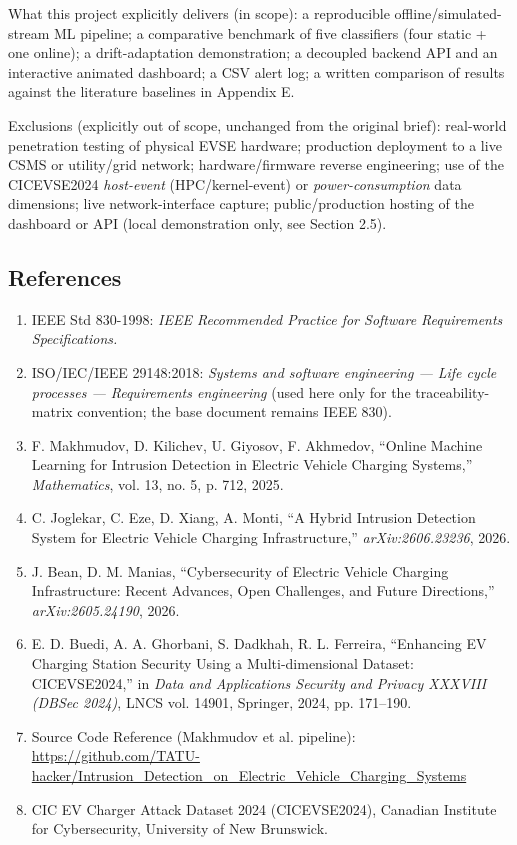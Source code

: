 \documentclass[11pt, a4paper]{article}
\begin{document}
What this project explicitly delivers (in scope): a reproducible offline/simulated-stream ML pipeline; a comparative benchmark of five classifiers (four static + one online); a drift-adaptation demonstration; a decoupled backend API and an interactive animated dashboard; a CSV alert log; a written comparison of results against the literature baselines in Appendix E.

Exclusions (explicitly out of scope, unchanged from the original brief): real-world penetration testing of physical EVSE hardware; production deployment to a live CSMS or utility/grid network; hardware/firmware reverse engineering; use of the CICEVSE2024 \textit{host-event} (HPC/kernel-event) or \textit{power-consumption} data dimensions; live network-interface capture; public/production hosting of the dashboard or API (local demonstration only, see Section 2.5).

\subsection{References}
\begin{enumerate}
    \item IEEE Std 830-1998: \textit{IEEE Recommended Practice for Software Requirements Specifications.}
    \item ISO/IEC/IEEE 29148:2018: \textit{Systems and software engineering --- Life cycle processes --- Requirements engineering} (used here only for the traceability-matrix convention; the base document remains IEEE 830).
    \item F. Makhmudov, D. Kilichev, U. Giyosov, F. Akhmedov, ``Online Machine Learning for Intrusion Detection in Electric Vehicle Charging Systems,'' \textit{Mathematics}, vol. 13, no. 5, p. 712, 2025.
    \item C. Joglekar, C. Eze, D. Xiang, A. Monti, ``A Hybrid Intrusion Detection System for Electric Vehicle Charging Infrastructure,'' \textit{arXiv:2606.23236}, 2026.
    \item J. Bean, D. M. Manias, ``Cybersecurity of Electric Vehicle Charging Infrastructure: Recent Advances, Open Challenges, and Future Directions,'' \textit{arXiv:2605.24190}, 2026.
    \item E. D. Buedi, A. A. Ghorbani, S. Dadkhah, R. L. Ferreira, ``Enhancing EV Charging Station Security Using a Multi-dimensional Dataset: CICEVSE2024,'' in \textit{Data and Applications Security and Privacy XXXVIII (DBSec 2024)}, LNCS vol. 14901, Springer, 2024, pp. 171--190.
    \item Source Code Reference (Makhmudov et al. pipeline): \url{https://github.com/TATU-hacker/Intrusion_Detection_on_Electric_Vehicle_Charging_Systems}
    \item CIC EV Charger Attack Dataset 2024 (CICEVSE2024), Canadian Institute for Cybersecurity, University of New Brunswick.
\end{enumerate}
\end{document}
